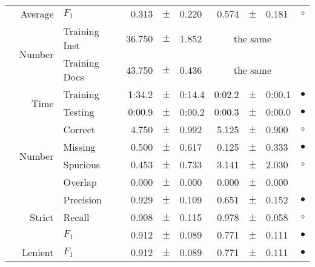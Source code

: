 \begin{longtable}{|r|r|l||rcl|rcl|c|}
\cline{2-10} &                     Average &           $F_1$ &       0.313 &  $\pm$  &       0.220 &       0.574 &  $\pm$  &       0.181 & $\circ$ \\
\cline{2-10} & \multirow{2}{*}{    Number} &   Training Inst &      36.750 &  $\pm$  &       1.852 &    \multicolumn{3}{c|}{the same}         &  \\
\cline{3-10} &                             &   Training Docs &      43.750 &  $\pm$  &       0.436 &    \multicolumn{3}{c|}{the same}         &  \\
\cline{2-10} & \multirow{2}{*}{      Time} &        Training &      1:34.2 &  $\pm$  &      0:14.4 &      0:02.2 &  $\pm$  &      0:00.1 & $\bullet$ \\
\cline{3-10} &                             &         Testing &      0:00.9 &  $\pm$  &      0:00.2 &      0:00.3 &  $\pm$  &      0:00.0 & $\bullet$ \\
\hline
\pagebreak
\hline
\hline
\multirow{11}{*}{\begin{sideways}start\end{sideways} }
             & \multirow{4}{*}{    Number} &         Correct &       4.750 &  $\pm$  &       0.992 &       5.125 &  $\pm$  &       0.900 & $\circ$ \\
\cline{3-10} &                             &         Missing &       0.500 &  $\pm$  &       0.617 &       0.125 &  $\pm$  &       0.333 & $\bullet$ \\
\cline{3-10} &                             &        Spurious &       0.453 &  $\pm$  &       0.733 &       3.141 &  $\pm$  &       2.030 & $\circ$ \\
\cline{3-10} &                             &         Overlap &       0.000 &  $\pm$  &       0.000 &       0.000 &  $\pm$  &       0.000 &  \\
\cline{2-10} & \multirow{3}{*}{    Strict} &       Precision &       0.929 &  $\pm$  &       0.109 &       0.651 &  $\pm$  &       0.152 & $\bullet$ \\
\cline{3-10} &                             &          Recall &       0.908 &  $\pm$  &       0.115 &       0.978 &  $\pm$  &       0.058 & $\circ$ \\
\cline{3-10} &                             &           $F_1$ &       0.912 &  $\pm$  &       0.089 &       0.771 &  $\pm$  &       0.111 & $\bullet$ \\
\cline{2-10} &                     Lenient &           $F_1$ &       0.912 &  $\pm$  &       0.089 &       0.771 &  $\pm$  &       0.111 & $\bullet$ \\

\end{longtable}

